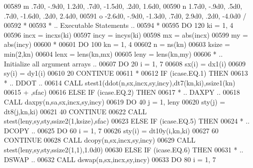 \begin{DoxyCode}
00589      m            .7d0,  -.9d0,  1.2d0,   .7d0, -1.5d0,   .2d0,  1.6d0,
00590      n           1.7d0,  -.9d0,   .5d0,   .7d0, -1.6d0,   .2d0,  2.4d0,
00591      o          -2.6d0,  -.9d0, -1.3d0,   .7d0,  2.9d0,   .2d0, -4.0d0 /
00592 \textcolor{comment}{*    }
00593 \textcolor{comment}{*     .. Executable Statements ..}
00594 \textcolor{comment}{*}
00595       \textcolor{keywordflow}{DO} 120 ki = 1, 4
00596          incx = incxs(ki)
00597          incy = incys(ki)
00598          mx = abs(incx)
00599          my = abs(incy)
00600 \textcolor{comment}{*}
00601          \textcolor{keywordflow}{DO} 100 kn = 1, 4
00602             n = ns(kn)
00603             ksize = min(2,kn)
00604             lenx = lens(kn,mx)
00605             leny = lens(kn,my)
00606 \textcolor{comment}{*           .. Initialize all argument arrays ..}
00607             \textcolor{keywordflow}{DO} 20 i = 1, 7
00608                sx(i) = dx1(i)
00609                sy(i) = dy1(i)
00610    20       \textcolor{keywordflow}{CONTINUE}
00611 \textcolor{comment}{*}
00612             \textcolor{keywordflow}{IF} (icase.EQ.1) \textcolor{keywordflow}{THEN}
00613 \textcolor{comment}{*              .. DDOT ..}
00614                \textcolor{keyword}{CALL }stest1(ddot(n,sx,incx,sy,incy),dt7(kn,ki),ssize1(kn)
00615      +                     ,sfac)
00616             \textcolor{keywordflow}{ELSE} \textcolor{keywordflow}{IF} (icase.EQ.2) \textcolor{keywordflow}{THEN}
00617 \textcolor{comment}{*              .. DAXPY ..}
00618                \textcolor{keyword}{CALL }daxpy(n,sa,sx,incx,sy,incy)
00619                \textcolor{keywordflow}{DO} 40 j = 1, leny
00620                   sty(j) = dt8(j,kn,ki)
00621    40          \textcolor{keywordflow}{CONTINUE}
00622                \textcolor{keyword}{CALL }stest(leny,sy,sty,ssize2(1,ksize),sfac)
00623             \textcolor{keywordflow}{ELSE} \textcolor{keywordflow}{IF} (icase.EQ.5) \textcolor{keywordflow}{THEN}
00624 \textcolor{comment}{*              .. DCOPY ..}
00625                \textcolor{keywordflow}{DO} 60 i = 1, 7
00626                   sty(i) = dt10y(i,kn,ki)
00627    60          \textcolor{keywordflow}{CONTINUE}
00628                \textcolor{keyword}{CALL }dcopy(n,sx,incx,sy,incy)
00629                \textcolor{keyword}{CALL }stest(leny,sy,sty,ssize2(1,1),1.0d0)
00630             \textcolor{keywordflow}{ELSE} \textcolor{keywordflow}{IF} (icase.EQ.6) \textcolor{keywordflow}{THEN}
00631 \textcolor{comment}{*              .. DSWAP ..}
00632                \textcolor{keyword}{CALL }dswap(n,sx,incx,sy,incy)
00633                \textcolor{keywordflow}{DO} 80 i = 1, 7

\end{DoxyCode}
